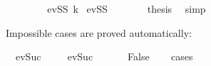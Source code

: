 \begin{isabellebody}
\ \ \isamarkupfalse%
\isanewline
\ \ \ \ \isamarkupfalse%
\ {\isacharparenleft}{\kern0pt}evSS\ k{\isacharparenright}{\kern0pt}\isanewline
{}\isamarkupfalse%
\ evSS\isanewline
\ \ \ \ \isamarkupfalse%
\ \isamarkupfalse%
\ {\isacharquery}{\kern0pt}thesis\ \isamarkupfalse%
\ simp\isanewline
\ \ \isamarkupfalse%
\isanewline
{}\isamarkupfalse%
%
\endisatagproof
{\isafoldproof}%
%
\isadelimproof
%
\endisadelimproof
%
\begin{isamarkuptext}%
Impossible cases are proved automatically:%
\end{isamarkuptext}\isamarkuptrue%
\isamarkupfalse%
\ {\isachardoublequoteopen}{\isasymnot}\ ev{\isacharparenleft}{\kern0pt}Suc\ {}{\isacharparenright}{\kern0pt}{\isachardoublequoteclose}\isanewline
%
\isadelimproof
%
\endisadelimproof
%
\isatagproof
{}\isamarkupfalse%
\isanewline
\ \ \isamarkupfalse%
\ {\isachardoublequoteopen}ev{\isacharparenleft}{\kern0pt}Suc\ {}{\isacharparenright}{\kern0pt}{\isachardoublequoteclose}\isanewline
\ \ \isamarkupfalse%
\ \isamarkupfalse%
\ False\isanewline
\ \ \isamarkupfalse%
\ cases\isanewline
\ \ \isamarkupfalse%
\isanewline
{}\isamarkupfalse%
%
\endisatagproof
{\isafoldproof}%
%
\isadelimproof
\isanewline
%
\endisadelimproof
\isanewline
%
\isadelimtheory
\isanewline
%
\endisadelimtheory
%
\isatagtheory
{}\isamarkupfalse%
%
\endisatagtheory
{\isafoldtheory}%
%
\isadelimtheory
%
\endisadelimtheory
%
\end{isabellebody}%
\endinput
